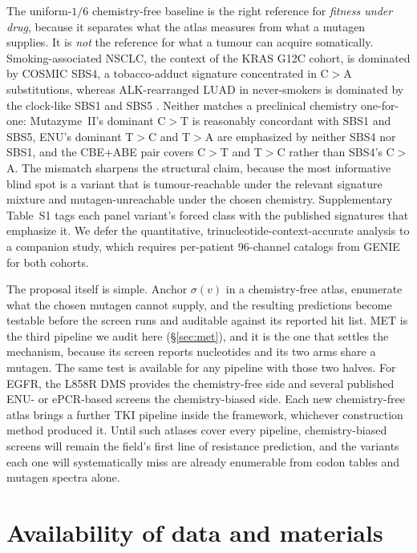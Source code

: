 \documentclass[11pt,a4paper]{article}
\begin{document}
The uniform-$1/6$ chemistry-free baseline is the right reference for
\emph{fitness under drug}, because it separates what the atlas measures
from what a mutagen supplies. It is \emph{not} the reference for what a
tumour can acquire somatically. Smoking-associated NSCLC, the context of
the KRAS G12C cohort, is dominated by COSMIC SBS4, a tobacco-adduct
signature concentrated in C$>$A substitutions, whereas ALK-rearranged
LUAD in never-smokers is dominated by the clock-like SBS1 and SBS5
\citep{alexandrov2020}. Neither matches a preclinical chemistry
one-for-one: Mutazyme~II's dominant C$>$T is reasonably concordant with
SBS1 and SBS5, ENU's dominant T$>$C and T$>$A are emphasized by neither
SBS4 nor SBS1, and the CBE+ABE pair covers C$>$T and T$>$C rather than
SBS4's C$>$A. The mismatch sharpens the structural claim, because the
most informative blind spot is a variant that is tumour-reachable under
the relevant signature mixture and mutagen-unreachable under the chosen
chemistry. Supplementary Table~S1 tags each panel variant's forced class
with the published signatures that emphasize it. We defer the
quantitative, trinucleotide-context-accurate analysis to a companion
study, which requires per-patient 96-channel catalogs from GENIE for
both cohorts.

The proposal itself is simple. Anchor $\sigma(v)$ in a chemistry-free
atlas, enumerate what the chosen mutagen cannot supply, and the
resulting predictions become testable before the screen runs and
auditable against its reported hit list. MET is the third pipeline we
audit here (\S\ref{sec:met}), and it is the one that settles the
mechanism, because its screen reports nucleotides and its two arms share
a mutagen. The same test is available for any pipeline with those two halves. For
EGFR, the L858R DMS
\citep{wang2025} provides the chemistry-free side and several published
ENU- or ePCR-based screens the chemistry-biased side. Each new
chemistry-free atlas brings a further TKI pipeline inside the framework,
whichever construction method produced it. Until such atlases cover
every pipeline, chemistry-biased screens will remain the field's first
line of resistance prediction, and the variants each one will
systematically miss are already enumerable from codon tables and mutagen
spectra alone.

\section*{Availability of data and materials}
\end{document}
